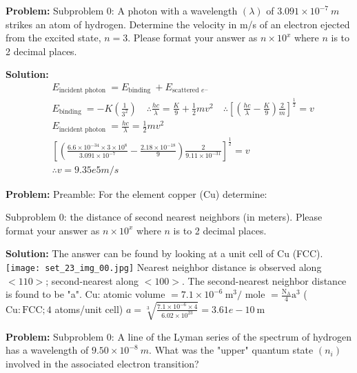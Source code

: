 \documentclass[10pt]{article}
\begin{document}
\textbf{Problem:}
Subproblem 0: A photon with a wavelength $(\lambda)$ of $3.091 \times 10^{-7} {~m}$ strikes an atom of hydrogen. Determine the velocity in m/s of an electron ejected from the excited state, $n=3$. Please format your answer as $n \times 10^x$ where $n$ is to 2 decimal places. 


\textbf{Solution:}
\[
\begin{aligned}
&E_{\text {incident photon }}=E_{\text {binding }}+E_{\text {scattered } e^{-}} \\
&E_{\text {binding }}=-K\left(\frac{1}{3^{2}}\right) \quad \therefore \frac{hc}{\lambda}=\frac{K}{9}+\frac{1}{2} {mv^{2 }} \quad \therefore\left[\left(\frac{{hc}}{\lambda}-\frac{{K}}{9}\right) \frac{2}{{m}}\right]^{\frac{1}{2}}={v} \\
&{E}_{\text {incident photon }}=\frac{{hc}}{\lambda}=\frac{1}{2} {mv}^{2} \\
&{\left[\left(\frac{6.6 \times 10^{-34} \times 3 \times 10^{8}}{3.091 \times 10^{-7}}-\frac{2.18 \times 10^{-18}}{9}\right) \frac{2}{9.11 \times 10^{-31}}\right]^{\frac{1}{2}}={v}} \\
&\therefore {v}= \boxed{9.35e5} {m} / {s}
\end{aligned}
\]


\textbf{Problem:}
Preamble: For the element copper (Cu) determine:

Subproblem 0: the distance of second nearest neighbors (in meters). Please format your answer as $n \times 10^x$ where $n$ is to 2 decimal places.


\textbf{Solution:}
The answer can be found by looking at a unit cell of $\mathrm{Cu}$ (FCC).
\texttt{[image: set\_23\_img\_00.jpg]}
\nonessentialimage
Nearest neighbor distance is observed along $<110>$; second-nearest along $<100>$. The second-nearest neighbor distance is found to be "a".
Cu: atomic volume $=7.1 \times 10^{-6} \mathrm{~m}^{3} /$ mole $=\frac{\mathrm{N}_{\mathrm{A}}}{4} \mathrm{a}^{3}$ ( $\mathrm{Cu}: \mathrm{FCC} ; 4$ atoms/unit cell) $a=\sqrt[3]{\frac{7.1 \times 10^{-6} \times 4}{6.02 \times 10^{23}}}= \boxed{3.61e-10} \mathrm{~m}$


\textbf{Problem:}
Subproblem 0: A line of the Lyman series of the spectrum of hydrogen has a wavelength of $9.50 \times 10^{-8} {~m}$. What was the "upper" quantum state $\left({n}_{{i}}\right)$ involved in the associated electron transition?
\end{document}
